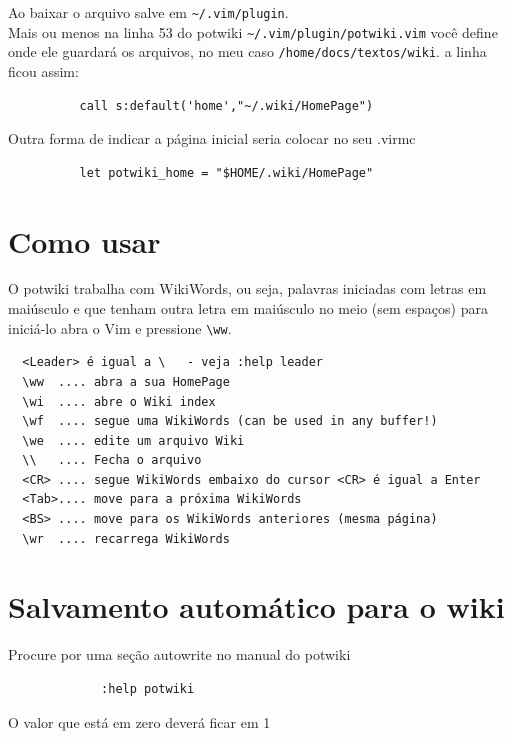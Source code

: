 \documentclass[10pt,a4paper,openany]{book}
\begin{document}
Ao baixar o arquivo salve em \verb|~/.vim/plugin|. \\



Mais ou menos na linha 53 do potwiki \verb|~/.vim/plugin/potwiki.vim| você
define onde ele guardará os arquivos, no meu caso
\verb|/home/docs/textos/wiki|. a linha ficou assim:

\begin{verbatim}
		  call s:default('home',"~/.wiki/HomePage")
\end{verbatim}

Outra forma de indicar a página inicial seria colocar no seu .virmc

\begin{verbatim}
		  let potwiki_home = "$HOME/.wiki/HomePage"
\end{verbatim}

\section{Como usar}
\label{Como usar}

O potwiki trabalha com WikiWords, ou seja, palavras iniciadas com
letras em maiúsculo e que tenham outra letra em maiúsculo no meio (sem
espaços) para iniciá-lo abra o Vim e pressione \verb|\ww|.

\begin{verbatim}
  <Leader> é igual a \   - veja :help leader
  \ww  .... abra a sua HomePage
  \wi  .... abre o Wiki index
  \wf  .... segue uma WikiWords (can be used in any buffer!)
  \we  .... edite um arquivo Wiki
  \\   .... Fecha o arquivo
  <CR> .... segue WikiWords embaixo do cursor <CR> é igual a Enter
  <Tab>.... move para a próxima WikiWords
  <BS> .... move para os WikiWords anteriores (mesma página)
  \wr  .... recarrega WikiWords
\end{verbatim}

\section{Salvamento automático para o wiki }
\label{Salvamento automático para o wiki }
Procure por uma seção autowrite no manual do potwiki

\begin{verbatim}
			 :help potwiki
\end{verbatim}

O valor que está em zero deverá ficar em 1
\end{document}
